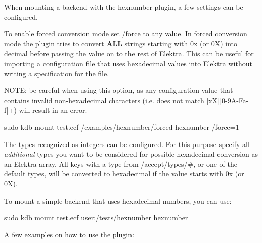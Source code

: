 When mounting a backend with the hexnumber plugin, a few settings can be configured.


\begin{DoxyEnumerate}
\item To enable forced conversion mode set {\ttfamily /force} to any value. In forced conversion mode the plugin tries to convert {\bfseries A\+LL} strings starting with {\ttfamily 0x} (or {\ttfamily 0X}) into decimal before passing the value on to the rest of Elektra. This can be useful for importing a configuration file that uses hexadecimal values into Elektra without writing a specification for the file.

N\+O\+TE\+: be careful when using this option, as any configuration value that contains invalid non-\/hexadecimal characters (i.\+e. does not match {\mbox{[}xX\mbox{]}\mbox{[}0-\/9\+A-\/\+Fa-\/f\mbox{]}+}) will result in an error.
\end{DoxyEnumerate}


\begin{DoxyCode}
sudo kdb mount test.ecf /examples/hexnumber/forced hexnumber /force=1
\end{DoxyCode}



\begin{DoxyEnumerate}
\item The types recognized as integers can be configured. For this purpose specify all {\itshape additional} types you want to be considered for possible hexadecimal conversion as an Elektra array. All keys with a type from {\ttfamily /accept/types/\#}, or one of the default types, will be converted to hexadecimal if the value starts with {\ttfamily 0x} (or {\ttfamily 0X}).
\end{DoxyEnumerate}





\begin{DoxyItemize}
\item To mount a simple backend that uses hexadecimal numbers, you can use\+: 
\begin{DoxyCode}
sudo kdb mount test.ecf user:/tests/hexnumber hexnumber
\end{DoxyCode}

\item A few examples on how to use the plugin\+:
\end{DoxyItemize}


